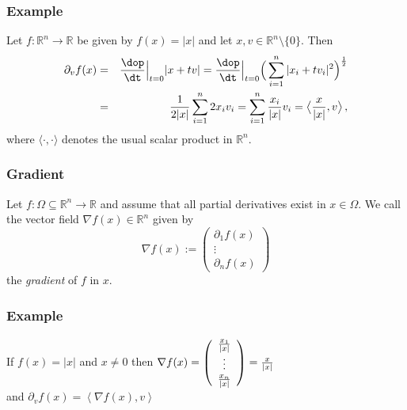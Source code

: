  \begin{frame}[fragile] \frametitle{Example}

  Let $f\colon \mathbb{R}^n \rightarrow \mathbb{R}$ be given by  $f(x) = |x|$ 
   and let $x , v \in \mathbb{R}^n \setminus \{0\}$.
  Then
  \begin{eqnarray*}
    \partial_v f(x)
    & = & {\dop\over \dt}\Big |_{t=0} |x+tv| 
     =  {\dop\over \dt} \Big |_{t=0} \Big(\sum_{i=1}^n |x_i + t v_i|^2\Big)^{1 \over 2} \\
    & = & {1 \over 2|x|} \sum_{i=1}^n 2 x_i v_i
     =  \sum_{i=1}^n {x_i \over |x|} v_i
     = \big \langle {x \over |x|}, v \big \rangle\,,
  \end{eqnarray*}
  where $\langle \cdot, \cdot \rangle$
  denotes the usual scalar product in $\mathbb{R}^n$.

\end{frame}

 \begin{frame}[fragile] \frametitle{Gradient}


  Let $f\colon \Omega \subseteq \mathbb{R}^n \rightarrow \mathbb{R}$ 
  and assume that all partial derivatives exist in $x \in \Omega$.
  We call the vector field $\nabla f(x)\in \mathbb R^n$ given by
  \[\nabla f(x) 
  := \left( \begin{array}{c}
      \partial_1 f(x)\\
      \vdots\\
      \partial_n f(x)
    \end{array} \right)\]
  the \emph{gradient} of $f$ in $x$.


\end{frame}

 \begin{frame}[fragile] \frametitle{Example}

  If $f(x) = |x|$
    and $x \neq 0$ then $\nabla f(x) = 
    \left( \begin{array}{c}
        {x_1 \over |x|}\\
        \vdots\\
        {x_n \over |x|}
      \end{array} \right) 
    = {x \over |x|}$\\
    and $\partial_v f(x) = \left< \nabla f(x), v \right>$


\end{frame}


